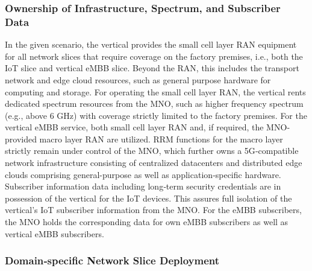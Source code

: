 \documentclass{report}
\begin{document}
\subsubsection{Ownership of Infrastructure, Spectrum, and Subscriber Data}
In the given scenario, the vertical provides the small cell layer RAN equipment for all network slices
that require coverage on the factory premises, i.e., both the IoT slice and vertical eMBB slice. Beyond
the RAN, this includes the transport network and edge cloud resources, such as general purpose
hardware for computing and storage. For operating the small cell layer RAN, the vertical rents dedicated spectrum resources from the MNO, such as higher frequency spectrum (e.g., above 6 GHz)
with coverage strictly limited to the factory premises. For the vertical eMBB service, both small cell
layer RAN and, if required, the MNO‐provided macro layer RAN are utilized. RRM functions for the
macro layer strictly remain under control of the MNO, which further owns a 5G‐compatible network infrastructure consisting of centralized datacenters and distributed edge clouds comprising general-purpose as well as application‐specific hardware. Subscriber information data including long‐term
security credentials are in possession of the vertical for the IoT devices. This assures full isolation of
the vertical’s IoT subscriber information from the MNO. For the eMBB subscribers, the MNO holds
the corresponding data for own eMBB subscribers as well as vertical eMBB subscribers.

\subsubsection{Domain‐specific Network Slice Deployment}
\end{document}
